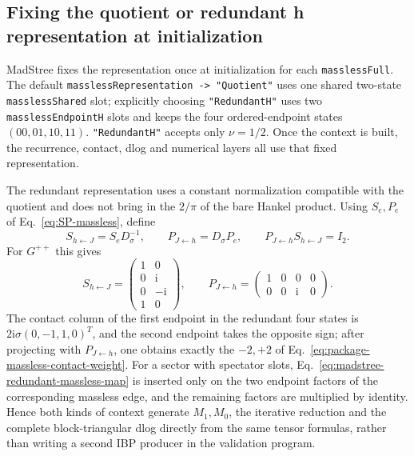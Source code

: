 \documentclass[11pt,a4paper]{article}
\newcommand{\ii}{\mathrm i}
\begin{document}
\subsection{Fixing the quotient or redundant h representation at initialization}

MadStree fixes the representation once at initialization for each \texttt{masslessFull}.
The default \texttt{masslessRepresentation -> "Quotient"} uses one shared two-state
\texttt{masslessShared} slot; explicitly choosing \texttt{"RedundantH"} uses two
\texttt{masslessEndpointH} slots and keeps the four ordered-endpoint states $(00,01,10,11)$.
\texttt{"RedundantH"} accepts only $\nu=1/2$. Once the context is built, the recurrence,
contact, dlog and numerical layers all use that fixed representation.

The redundant representation uses a constant normalization compatible with the quotient and does not bring in the $2/\pi$ of the bare Hankel product. Using $S_e,P_e$ of Eq.~\eqref{eq:SP-massless}, define
\begin{equation}
 S_{h\leftarrow J}=S_eD_{\sigma}^{-1},\qquad
 P_{J\leftarrow h}=D_{\sigma}P_e,\qquad
 P_{J\leftarrow h}S_{h\leftarrow J}=I_2.
 \label{eq:madstree-redundant-massless-map}
\end{equation}
For $G^{++}$ this gives
\begin{equation}
 S_{h\leftarrow J}=\begin{pmatrix}1&0\\0&\ii\\0&-\ii\\1&0\end{pmatrix},
 \qquad
 P_{J\leftarrow h}=\begin{pmatrix}1&0&0&0\\0&0&\ii&0\end{pmatrix}.
\end{equation}
The contact column of the first endpoint in the redundant four states is
$2\ii\sigma(0,-1,1,0)^T$, and the second endpoint takes the opposite sign; after projecting with
$P_{J\leftarrow h}$, one obtains exactly the $-2,+2$ of Eq.~\eqref{eq:package-massless-contact-weight}.
For a sector with spectator slots, Eq.~\eqref{eq:madstree-redundant-massless-map} is inserted only on the two endpoint factors of the corresponding massless edge, and the remaining factors are multiplied by identity. Hence both kinds of context generate $M_1,M_0$, the iterative reduction and the complete block-triangular dlog directly from the same tensor formulas, rather than writing a second IBP producer in the validation program.
\end{document}
